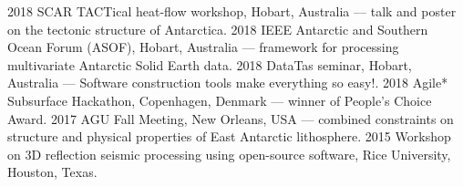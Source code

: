 \documentclass[11pt, a4paper]{cvClass}
\begin{document}
\begin{cvhonors}
    {}
    {}
  \cvhonor
    {2018}
    {SCAR TACTical heat-flow workshop, Hobart, Australia — talk and poster on the tectonic structure of Antarctica.}
    {}
    {}
  \cvhonor
    {2018}
    {IEEE Antarctic and Southern Ocean Forum (ASOF), Hobart, Australia — framework for processing multivariate Antarctic Solid Earth data.}
    {}
    {}
  \cvhonor
    {2018}
    {DataTas seminar, Hobart, Australia — Software construction tools make everything so easy!.}
    {}
    {}
  \cvhonor
    {2018}
    {Agile* Subsurface Hackathon, Copenhagen, Denmark — winner of People's Choice Award.}
    {}
    {}
  \cvhonor
    {2017}
    {AGU Fall Meeting, New Orleans, USA — combined constraints on structure and physical properties of East Antarctic lithosphere.}
    {}
    {}
  \cvhonor
    {2015}
    {Workshop on 3D reflection seismic processing using open-source software, Rice University, Houston, Texas.}
    {}
    {}
\end{cvhonors}

\clearpage
{}
\end{document}
